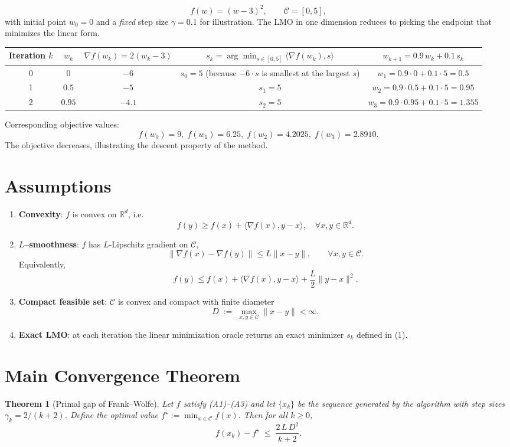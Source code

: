 \documentclass{article}
\newtheorem{theorem}{Theorem}
\begin{document}
\[
f(w)= (w-3)^2,\qquad \mathcal{C}=[0,5],
\]
with initial point $w_0=0$ and a \emph{fixed} step size $\gamma=0.1$ for illustration.
The LMO in one dimension reduces to picking the endpoint that minimizes the linear form.

\begin{center}
\begin{tabular}{c|c|c|c|c}
Iteration $k$ & $w_k$ & $\nabla f(w_k)=2(w_k-3)$ & $s_k=\arg\min_{s\in[0,5]}\langle\nabla f(w_k),s\rangle$ & $w_{k+1}=0.9\,w_k+0.1\,s_k$ \\ \hline
0 & $0$ & $-6$ & $s_0=5$ (because $-6\cdot s$ is smallest at the largest $s$) & $w_1=0.9\cdot0+0.1\cdot5=0.5$ \\
1 & $0.5$ & $-5$ & $s_1=5$ & $w_2=0.9\cdot0.5+0.1\cdot5=0.95$ \\
2 & $0.95$ & $-4.1$ & $s_2=5$ & $w_3=0.9\cdot0.95+0.1\cdot5=1.355$ \\
\end{tabular}
\end{center}
Corresponding objective values:
\[
f(w_0)=9,\; f(w_1)=6.25,\; f(w_2)=4.2025,\; f(w_3)=2.8910.
\]
The objective decreases, illustrating the descent property of the method.

\section*{Assumptions}
\begin{enumerate}
    \item \textbf{Convexity}: $f$ is convex on $\mathbb{R}^d$, i.e.
    \[
    f(y)\ge f(x)+\langle\nabla f(x),y-x\rangle,\quad\forall x,y\in\mathbb{R}^d .
    \tag{A1}
    \]
    \item \textbf{$L$–smoothness}: $f$ has $L$‑Lipschitz gradient on $\mathcal{C}$,
    \[
    \|\nabla f(x)-\nabla f(y)\| \le L\|x-y\|,\qquad\forall x,y\in\mathcal{C}.
    \tag{A2}
    \]
    Equivalently,
    \[
    f(y)\le f(x)+\langle\nabla f(x),y-x\rangle+\frac{L}{2}\|y-x\|^2 .
    \tag{A2$'$}
    \]
    \item \textbf{Compact feasible set}: $\mathcal{C}$ is convex and compact with finite diameter
    \[
    D \;:=\;\max_{x,y\in\mathcal{C}}\|x-y\| <\infty .
    \tag{A3}
    \]
    \item \textbf{Exact LMO}: at each iteration the linear minimization oracle returns an exact minimizer $s_k$ defined in (1).
\end{enumerate}

\section*{Main Convergence Theorem}
\begin{theorem}[Primal gap of Frank–Wolfe]\label{thm:fw}
Let $f$ satisfy (A1)–(A3) and let $\{x_k\}$ be the sequence generated by the algorithm with step sizes $\gamma_k=2/(k+2)$.  
Define the optimal value $f^\star:=\min_{x\in\mathcal{C}}f(x)$.  
Then for all $k\ge 0$,
\[
f(x_k)-f^\star \;\le\; \frac{2\,L\,D^{2}}{k+2}.
\tag{4}
\]
\end{theorem}
\end{document}
